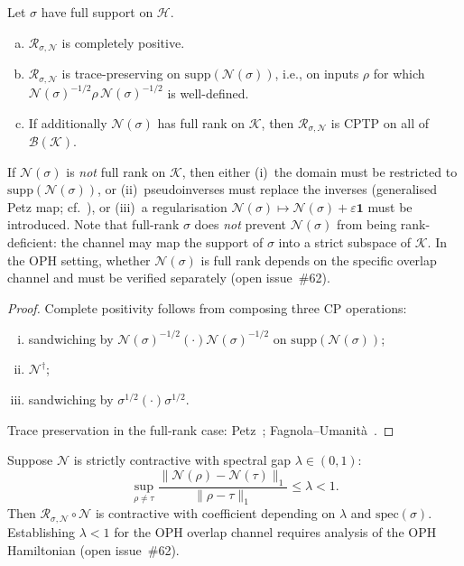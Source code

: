\begin{proposition}
\label{prop:petz-cptp}
Let $\sigma$ have full support on $\mathcal{H}$.
\begin{enumerate}[(a)]
  \item $\mathcal{R}_{\sigma,\mathcal{N}}$ is completely positive.
  \item $\mathcal{R}_{\sigma,\mathcal{N}}$ is trace-preserving on
        $\mathrm{supp}(\mathcal{N}(\sigma))$, i.e., on inputs $\rho$
        for which $\mathcal{N}(\sigma)^{-1/2}\rho\,\mathcal{N}(\sigma)^{-1/2}$
        is well-defined.
  \item If additionally $\mathcal{N}(\sigma)$ has full rank on $\mathcal{K}$,
        then $\mathcal{R}_{\sigma,\mathcal{N}}$ is \textrm{CPTP} on all
        of $\mathcal{B}(\mathcal{K})$.
\end{enumerate}
If $\mathcal{N}(\sigma)$ is \emph{not} full rank on $\mathcal{K}$,
then either (i)~the domain must be restricted to
$\mathrm{supp}(\mathcal{N}(\sigma))$, or
(ii)~pseudoinverses must replace the inverses (generalised Petz map;
cf.~\cite{Junge2018}), or
(iii)~a regularisation
$\mathcal{N}(\sigma)\mapsto\mathcal{N}(\sigma)+\varepsilon\mathbf{1}$
must be introduced.
Note that full-rank $\sigma$ does \emph{not} prevent $\mathcal{N}(\sigma)$
from being rank-deficient: the channel may map the support of $\sigma$
into a strict subspace of $\mathcal{K}$.
In the \textrm{OPH} setting, whether $\mathcal{N}(\sigma)$ is full rank
depends on the specific overlap channel and must be verified separately
(open issue~\#62).
\end{proposition}

\begin{proof}
Complete positivity follows from composing three \textrm{CP} operations:
\begin{enumerate}[(i)]
  \item sandwiching by
        $\mathcal{N}(\sigma)^{-1/2}(\cdot)\mathcal{N}(\sigma)^{-1/2}$
        on $\mathrm{supp}(\mathcal{N}(\sigma))$;
  \item $\mathcal{N}^\dagger$;
  \item sandwiching by $\sigma^{1/2}(\cdot)\sigma^{1/2}$.
\end{enumerate}
Trace preservation in the full-rank case:
Petz~\cite{Petz1986}; Fagnola--Umanit\`{a}~\cite{FagnolaUmanita2010}.
\end{proof}

\begin{proposition}
\label{prop:petz-contraction}
Suppose $\mathcal{N}$ is strictly contractive with spectral gap
$\lambda\in(0,1)$:
\[
  \sup_{\rho\neq\tau}
  \frac{\|\mathcal{N}(\rho)-\mathcal{N}(\tau)\|_1}
       {\|\rho-\tau\|_1}
  \leq\lambda<1.
\]
Then $\mathcal{R}_{\sigma,\mathcal{N}}\circ\mathcal{N}$ is contractive
with coefficient depending on $\lambda$ and $\mathrm{spec}(\sigma)$.
Establishing $\lambda<1$ for the OPH overlap channel requires analysis
of the OPH Hamiltonian (open issue~\#62).
\end{proposition}


